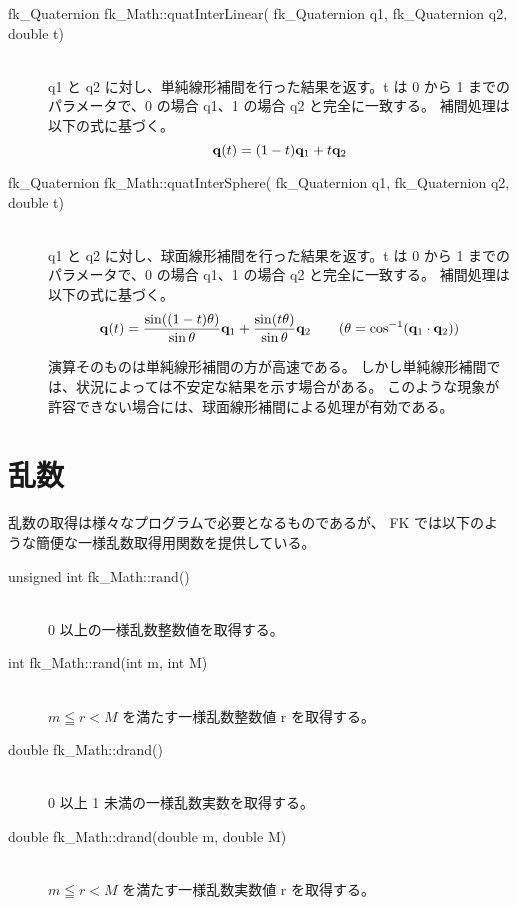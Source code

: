 \begin{description}
\item[fk\_Quaternion fk\_Math::quatInterLinear(
fk\_Quaternion q1, fk\_Quaternion q2, double t)] ~ \\
q1 と q2 に対し、単純線形補間を行った結果を返す。t は 0 から 1 までの
パラメータで、0 の場合 q1、1 の場合 q2 と完全に一致する。
補間処理は以下の式に基づく。
\[
	\mathbf{q}(t) = (1 - t)\mathbf{q}_1 + t\mathbf{q}_2
\]

\item[fk\_Quaternion fk\_Math::quatInterSphere(
fk\_Quaternion q1, fk\_Quaternion q2, double t)] ~ \\
q1 と q2 に対し、球面線形補間を行った結果を返す。t は 0 から 1 までの
パラメータで、0 の場合 q1、1 の場合 q2 と完全に一致する。
補間処理は以下の式に基づく。
\[
	\mathbf{q}(t) = \frac{\sin((1-t)\theta)}{\sin\theta}\mathbf{q}_1 +
	       \frac{\sin(t\theta)}{\sin\theta}\mathbf{q}_2
	       \qquad (\theta = \cos^{-1}(\mathbf{q}_1\cdot\mathbf{q}_2))
\]

演算そのものは単純線形補間の方が高速である。
しかし単純線形補間では、状況によっては不安定な結果を示す場合がある。
このような現象が許容できない場合には、球面線形補間による処理が有効である。
\end{description}

\section{乱数}
乱数の取得は様々なプログラムで必要となるものであるが、
FK では以下のような簡便な一様乱数取得用関数を提供している。

\begin{description}
\item[unsigned int fk\_Math::rand()] ~ \\
	0 以上の一様乱数整数値を取得する。\\

\item[int fk\_Math::rand(int m, int M)] ~ \\
	\(m \leqq r < M\) を満たす一様乱数整数値 r を取得する。\\

\item[double fk\_Math::drand()] ~ \\
	0 以上 1 未満の一様乱数実数を取得する。\\

\item[double fk\_Math::drand(double m, double M)] ~ \\
	\(m \leqq r < M\) を満たす一様乱数実数値 r を取得する。
\end{description}
